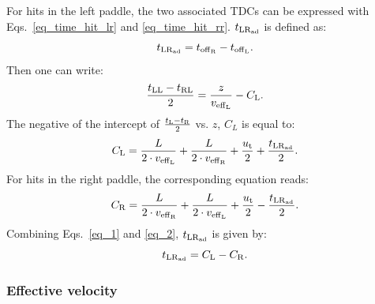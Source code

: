 For hits in the left paddle, the two associated TDCs can be expressed with Eqs.~\ref{eq_time_hit_lr} and \ref{eq_time_hit_rr}. 
%
$t_{\rm{LR}_{\rm{ad}}}$ is defined as:
\begin{equation}
t_{\rm{LR}_{\rm{ad}}}=t_{\rm{off}_{\rm{R}}}-t_{\rm{off}_{\rm{L}}}.
\end{equation}
%
Then one can write:
\begin{equation}\label{eq_15}
\frac{t_{\rm{LL}}-t_{\rm{RL}}}{2}=\frac{z}{v_{\rm{eff}_{\rm{L}}}}-C_{\rm{L}}.
\end{equation}
The negative of the intercept of $\frac{t_{\rm{L}}-t_{\rm{R}}}{2}$ vs. $z$, $C_L$ is equal to:
\begin{equation}
\label{eq_1}
C_{\rm{L}}=\frac{L}{2\cdot v_{\rm{eff}_{\rm{L}}}}+\frac{L}{2\cdot v_{\rm{eff}_{\rm{R}}}}+\frac{u_{\rm{t}}}{2}+\frac{t_{\rm{LR}_{\rm{ad}}}}{2}.
\end{equation}
For hits in the right paddle, the corresponding equation reads:
\begin{equation}
\label{eq_2}
C_{\rm{R}}=\frac{L}{2\cdot v_{\rm{eff}_{\rm{R}}}}+\frac{L}{2\cdot v_{\rm{eff}_{\rm{L}}}}+\frac{u_{\rm{t}}}{2}-\frac{t_{\rm{LR}_{\rm{ad}}}}{2}.
\end{equation}
Combining Eqs.~\ref{eq_1} and \ref{eq_2}, $t_{\rm{LR}_{\rm{ad}}}$ is given by:
\begin{equation}
t_{\rm{LR}_{\rm{ad}}}=C_{\rm{L}}-C_{\rm{R}}.
\end{equation}

\subsubsection{Effective velocity }

